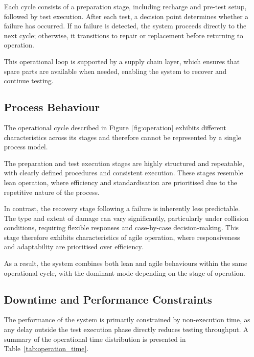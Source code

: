 \documentclass[11pt, a4paper]{report}
\numberwithin{equation}{section}
\begin{document}
\begin{refsection}
Each cycle consists of a preparation stage, including recharge and pre-test setup, followed by test execution. After each test, a decision point determines whether a failure has occurred. If no failure is detected, the system proceeds directly to the next cycle; otherwise, it transitions to repair or replacement before returning to operation.

This operational loop is supported by a supply chain layer, which ensures that spare parts are available when needed, enabling the system to recover and continue testing.

\subsection{Process Behaviour}

The operational cycle described in Figure~\ref{fig:operation} exhibits different characteristics across its stages and therefore cannot be represented by a single process model.

The preparation and test execution stages are highly structured and repeatable, with clearly defined procedures and consistent execution. These stages resemble lean operation, where efficiency and standardisation are prioritised due to the repetitive nature of the process.

In contrast, the recovery stage following a failure is inherently less predictable. The type and extent of damage can vary significantly, particularly under collision conditions, requiring flexible responses and case-by-case decision-making. This stage therefore exhibits characteristics of agile operation, where responsiveness and adaptability are prioritised over efficiency.

As a result, the system combines both lean and agile behaviours within the same operational cycle, with the dominant mode depending on the stage of operation.

\subsection{Downtime and Performance Constraints}

The performance of the system is primarily constrained by non-execution time, as any delay outside the test execution phase directly reduces testing throughput. A summary of the operational time distribution is presented in Table~\ref{tab:operation_time}.

\begin{table}[H]
\centering
\small
\renewcommand{\arraystretch}{1}


\end{table}
\end{refsection}
\end{document}
